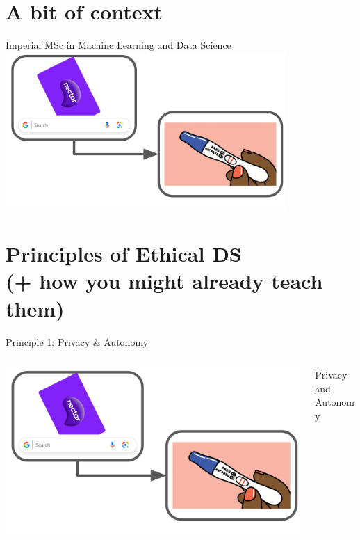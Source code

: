 \section{A bit of context}

\begin{frame}{Imperial MSc in Machine Learning and Data Science}
\centering
\includegraphics[width = 0.8\textwidth, page = 2]{images/RSS_pictures.pdf}
\end{frame}

\section{ Principles of Ethical DS \\ \large{(+ how you might already teach them)}}

\begin{frame}{Principle 1: Privacy \& Autonomy}
\begin{columns}
    \begin{column}{0.7 \textwidth}
     \includegraphics[width = \textwidth, page = 3]{images/RSS_pictures.pdf}
    \end{column}
    \begin{column}{0.3 \textwidth}
    Privacy and Autonomy
    \end{column}
\end{columns}
\end{frame}

